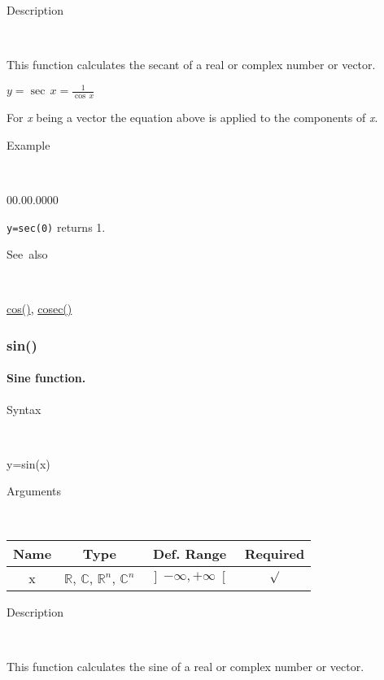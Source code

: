 \begin{description}
\item [Description]~
\end{description}
This function calculates the secant of a real or complex number or
vector.

\medskip{}
$y=$$\sec\, x$$={\displaystyle \frac{1}{\cos\, x}}$
\medskip{}

\noindent For \textit{x} being a vector the equation above is applied
to the components of \textit{x}.

\begin{description}
\item [Example]~
\end{description}
\begin{lyxlist}{00.00.0000}
\item [\texttt{y=sec(0)}]returns 1.
\end{lyxlist}
\begin{description}
\item [See~also]~
\end{description}
\textcolor{blue}{\hyperlink{cos}{cos()}}\textcolor{black}{,} \textcolor{blue}{\hyperlink{cosec}{cosec()}}


\newpage
\subsubsection*{\hypertarget{sin}{}{\Large sin()}}


\paragraph{\label{par:Sine}Sine function.}

\begin{description}
\item [Syntax]~
\end{description}
y=sin(x)

\begin{description}
\item [Arguments]~
\end{description}
\begin{tabular}{|c|c|c|c|}
\hline 
Name&
Type&
Def. Range&
Required\tabularnewline
\hline
\hline 
x&
$\mathbb{R}$, $\mathbb{C}$, $\mathbb{R}^{n}$, $\mathbb{C}^{n}$&
$\left]-\infty,+\infty\right[$&
$\surd$\tabularnewline
\hline
\end{tabular}

\begin{description}
\item [Description]~
\end{description}
This function calculates the sine of a real or complex number or vector.

